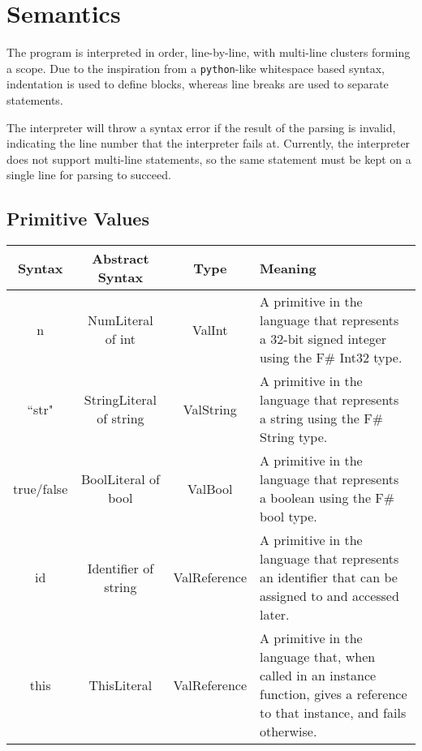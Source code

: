 \documentclass{article}
\begin{document}
\section{Semantics}
The program is interpreted in order, line-by-line, with multi-line clusters forming a scope. Due to the inspiration from a \texttt{python}-like whitespace based syntax, indentation is used to define blocks, whereas line breaks are used to separate statements.

The interpreter will throw a syntax error if the result of the parsing is invalid, indicating the line number that the interpreter fails at. Currently, the interpreter does not support multi-line statements, so the same statement must be kept on a single line for parsing to succeed.

\subsection{Primitive Values}
\begin{center}
 \begin{tabularx}{\linewidth}{|c|c|c|X|} 
 \hline
 Syntax & Abstract Syntax & Type & Meaning \\
 \hline
 n & NumLiteral of int & ValInt & A primitive in the language that represents a 32-bit signed integer using the F\# Int32 type. \\ 
 \hline
 ``str" & StringLiteral of string & ValString & A primitive in the language that represents a string using the F\# String type. \\
 \hline
 true/false & BoolLiteral of bool & ValBool & A primitive in the language that represents a boolean using the F\# bool type. \\
 \hline
 id & Identifier of string & ValReference & A primitive in the language that represents an identifier that can be assigned to and accessed later. \\
 \hline
 this & ThisLiteral & ValReference & A primitive in the language that, when called in an instance function, gives a reference to that instance, and fails otherwise. \\
 \hline
\end{tabularx}
\end{center}

\clearpage
\end{document}
